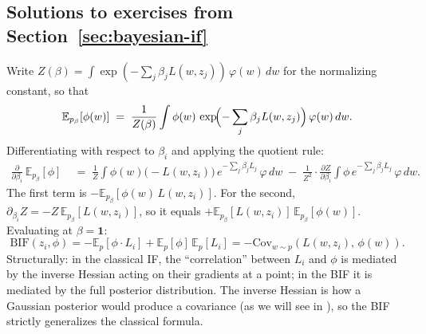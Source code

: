 \documentclass[11pt]{article}
\newcommand{\E}{\mathbb{E}}
\begin{document}
\begin{pdfonly}\begin{solutionsonly}
\subsection{Solutions to exercises from Section~\ref{sec:bayesian-if}}
\end{solutionsonly}\end{pdfonly}

\begin{solution}

Write $Z(\beta) = \int \exp(-\sum_j \beta_j L(w,z_j))\,\varphi(w)\,dw$ for the normalizing constant, so that
\[
  \E_{p_\beta}[\phi(w)] \;=\; \frac{1}{Z(\beta)}\int \phi(w)\,\exp\!\Bigl(-\sum_j \beta_j L(w,z_j)\Bigr)\,\varphi(w)\,dw.
\]
Differentiating with respect to $\beta_i$ and applying the quotient rule:
\begin{align*}
  \frac{\partial}{\partial\beta_i}\,\E_{p_\beta}[\phi] &\;=\; \frac{1}{Z}\int \phi(w)\bigl(-L(w,z_i)\bigr)\,e^{-\sum_j\beta_j L_j}\,\varphi\,dw \;-\; \frac{1}{Z^2}\cdot\frac{\partial Z}{\partial\beta_i}\int \phi\,e^{-\sum_j\beta_j L_j}\,\varphi\,dw.
\end{align*}
The first term is $-\E_{p_\beta}[\phi(w)\,L(w,z_i)]$. For the second, $\partial_{\beta_i}Z = -Z\,\E_{p_\beta}[L(w,z_i)]$, so it equals $+\E_{p_\beta}[L(w,z_i)]\,\E_{p_\beta}[\phi(w)]$. Evaluating at $\beta=\mathbf{1}$:
\[
  \mathrm{BIF}(z_i,\phi) = -\E_p[\phi\cdot L_i] + \E_p[\phi]\,\E_p[L_i] = -\mathrm{Cov}_{w\sim p}(L(w,z_i),\,\phi(w)).
\]
Structurally: in the classical IF, the ``correlation'' between $L_i$ and $\phi$ is mediated by the inverse Hessian acting on their gradients at a point; in the BIF it is mediated by the full posterior distribution. The inverse Hessian is how a Gaussian posterior would produce a covariance (as we will see in ), so the BIF strictly generalizes the classical formula.

\end{solution}
\end{document}
